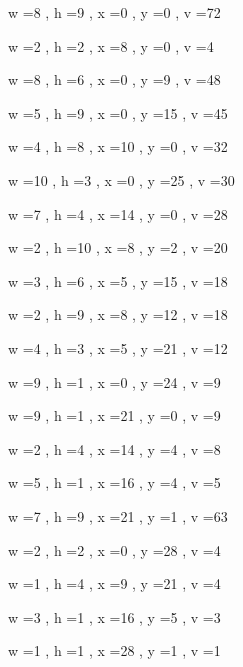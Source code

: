 \documentclass[11pt]{article}
\begin{document}
w =8 , h =9 , x =0 , y =0 , v =72
\par
w =2 , h =2 , x =8 , y =0 , v =4
\par
w =8 , h =6 , x =0 , y =9 , v =48
\par
w =5 , h =9 , x =0 , y =15 , v =45
\par
w =4 , h =8 , x =10 , y =0 , v =32
\par
w =10 , h =3 , x =0 , y =25 , v =30
\par
w =7 , h =4 , x =14 , y =0 , v =28
\par
w =2 , h =10 , x =8 , y =2 , v =20
\par
w =3 , h =6 , x =5 , y =15 , v =18
\par
w =2 , h =9 , x =8 , y =12 , v =18
\par
w =4 , h =3 , x =5 , y =21 , v =12
\par
w =9 , h =1 , x =0 , y =24 , v =9
\par
w =9 , h =1 , x =21 , y =0 , v =9
\par
w =2 , h =4 , x =14 , y =4 , v =8
\par
w =5 , h =1 , x =16 , y =4 , v =5
\par
w =7 , h =9 , x =21 , y =1 , v =63
\par
w =2 , h =2 , x =0 , y =28 , v =4
\par
w =1 , h =4 , x =9 , y =21 , v =4
\par
w =3 , h =1 , x =16 , y =5 , v =3
\par
w =1 , h =1 , x =28 , y =1 , v =1
\par
\newpage
\end{document}
